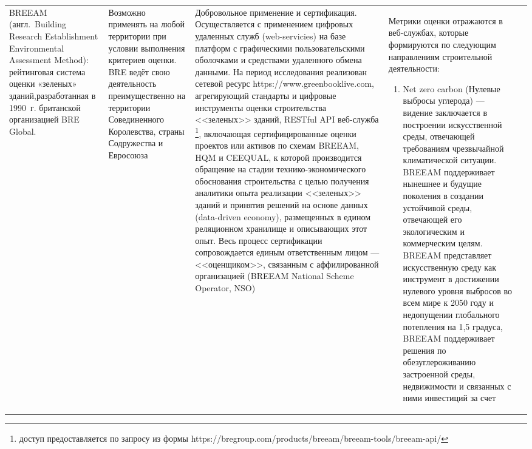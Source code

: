 \begin{landscape}
\begin{center}
\begin{longtable}{|m{40mm}|p{40mm}|p{40mm}|p{55mm}|p{55mm}|}
                BREEAM (\mbox{англ.}~Building  Research Establishment Environmental Assessment Method): рейтинговая  система  оценки «зеленых» зданий,разработанная в 1990~г. британской организацией BRE Global. &
                    Возможно применять на любой территории при условии выполнения критериев оценки. BRE ведёт свою деятельность преимущественно на территории Совединенного Королевства, страны Содружества и Евросоюза &
                    Добровольное применение и сертификация. Осуществляется с применением цифровых удаленных служб (web-servicies) на базе платформ с графическими пользовательскими оболочками и средствами удаленного обмена данными.
                    На период исследования реализован сетевой ресурс https://www.greenbooklive.com, агрегирующий стандарты и цифровые инструменты оценки строительства <<зеленых>> зданий,
                    RESTful API веб-служба \footnote{доступ предоставляется по запросу из формы https://bregroup.com/products/breeam/breeam-tools/breeam-api/},
                    включающая сертифицированные оценки проектов или активов по схемам BREEAM, HQM и CEEQUAL, к которой производится обращение на стадии
                    технико-экономического обоснования строительства с целью получения аналитики опыта реализации <<зеленых>> зданий и принятия решений на основе данных (data-driven economy),
                    размещенных в едином реляционном хранилище и описывающих этот опыт. Весь процесс сертификации сопровождается единым ответственным лицом --- <<оценщиком>>, связанным с аффилированной организацией (BREEAM National Scheme Operator, NSO) &
                    Метрики оценки отражаются в веб-службах, которые формируются по следующим направлениям строительной деятельности:
                        \begin{enumerate}[1)]
                            \item Net zero carbon (Нулевые выбросы углерода) --- видение заключается в построении искусственной среды, отвечающей требованиям чрезвычайной климатической ситуации.
                                BREEAM поддерживает нынешнее и будущие поколения в создании устойчивой среды, отвечающей его экологическим и коммерческим целям.
                                BREEAM представляет искусственную среду как инструмент в достижении нулевого уровня выбросов во всем мире к 2050 году и недопущении глобального потепления на 1,5 градуса,
                                BREEAM поддерживает решения по обезуглероживанию застроенной среды, недвижимости и связанных с ними инвестиций за счет 

\end{enumerate}
\end{longtable}
\end{center}
\end{landscape}
